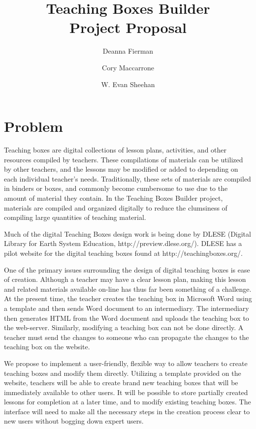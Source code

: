 \documentclass[11pt,letter]{article}
\title{Teaching Boxes Builder\\Project Proposal}
\author{Deanna Fierman \and Cory Maccarrone \and W. Evan Sheehan}
\begin{document}
\begin{titlepage}
	\maketitle
	\thispagestyle{empty}
\end{titlepage}

\section{Problem}

Teaching boxes are digital collections of lesson plans, activities, and other
resources compiled by teachers. These compilations of materials can be utilized
by other teachers, and the lessons may be modified or added to depending on each
individual teacher's needs. Traditionally, these sets of materials are compiled
in binders or boxes, and commonly become cumbersome to use due to the amount of
material they contain.  In the Teaching Boxes Builder project, materials are
compiled and organized digitally to reduce the clumsiness of compiling large
quantities of teaching material.

Much of the digital Teaching Boxes design work is being done by DLESE (Digital
Library for Earth System Education, http://preview.dlese.org/). DLESE has a
pilot website for the digital teaching boxes found at http://teachingboxes.org/.

One of the primary issues surrounding the design of digital teaching boxes is
ease of creation.  Although a teacher may have a clear lesson plan, making this
lesson and related materials available on-line has thus far been something of a
challenge.  At the present time, the teacher creates the teaching box in
Microsoft Word using a template and then sends Word document to an intermediary.
The intermediary then generates HTML from the Word document and uploads the
teaching box to the web-server. Similarly, modifying a teaching box can not be
done directly. A teacher must send the changes to someone who can propagate the
changes to the teaching box on the website.

We propose to implement a user-friendly, flexible way to allow teachers to
create teaching boxes and modify them directly. Utilizing a template provided on
the website, teachers will be able to create brand new teaching boxes that will
be immediately available to other users. It will be possible to store partially
created lessons for completion at a later time, and to modify existing teaching
boxes. The interface will need to make all the necessary steps in the creation
process clear to new users without bogging down expert users.
\end{document}

